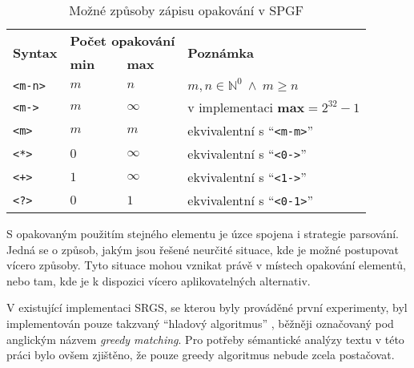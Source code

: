 \begin{table}[ht!]
	\centering
	\def\width{14mm}
	\begin{tabular}{|l|p{\width}|p{\width}|l|}
		\hline
		\multirow{2}{*}{\textbf{Syntax}} & \multicolumn{2}{c|}{\textbf{Počet opakování}} & \multirow{2}{*}{\textbf{Poznámka}}                                               \\
		\cline{2-3}
		                                 & \textbf{min}                                  & \textbf{max}                       &                                             \\
		\hline
		\texttt{<m-n>}                   & $m$                                           & $n$                                & $m,n \in \mathbb{N}^{0} \ \wedge \ m\geq n$ \\
		\hline
		\texttt{<m->}                    & $m$                                           & $\infty$                           & v implementaci $\textbf{max} = 2^{32}-1$    \\
		\hline
		\texttt{<m>}                     & $m$                                           & $m$                                & ekvivalentní s \enquote{\texttt{<m-m>}}     \\
		\hline
		\texttt{<*>}                     & $0$                                           & $\infty$                           & ekvivalentní s \enquote{\texttt{<0->}}      \\
		\hline
		\texttt{<+>}                     & $1$                                           & $\infty$                           & ekvivalentní s \enquote{\texttt{<1->}}      \\
		\hline
		\texttt{<?>}                     & $0$                                           & $1$                                & ekvivalentní s \enquote{\texttt{<0-1>}}     \\
		\hline
	\end{tabular}
	\caption{Možné způsoby zápisu opakování v SPGF}\label{tab:repeat_syntax}
\end{table}

S opakovaným použitím stejného elementu je úzce spojena i strategie parsování.
Jedná se o způsob, jakým jsou řešené neurčité situace, kde je možné postupovat vícero způsoby.
Tyto situace mohou vznikat právě v místech opakování elementů, nebo tam, kde je k dispozici vícero aplikovatelných alternativ.

V existující implementaci SRGS, se kterou byly prováděné první experimenty, byl implementován pouze takzvaný \enquote{hladový algoritmus}
, běžněji označovaný pod anglickým názvem \emph{greedy matching}.
Pro potřeby sémantické analýzy textu v této práci bylo ovšem zjištěno, že pouze greedy
algoritmus nebude zcela postačovat.

